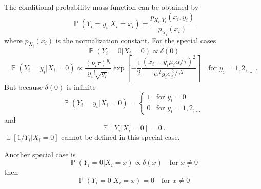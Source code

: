 \documentclass[12pt]{report}
\DeclareMathOperator{\expectation}{\mathbb{E}}
\DeclareMathOperator{\prob}{\mathbb{P}}
\newcommand{\dotdotdot}{_{\phantom{.}\cdots}}
\begin{document}
The conditional probability mass function can be obtained by
\begin{equation*}
\prob\left(Y_i=y_i|X_i=x_i\right)=\frac{p_{X_i,Y_i}\left(x_i,y_i\right)}{p_{X_i}(x_i)}
\end{equation*}
where $p_{X_i}(x_i)$ is the normalization constant.
For the special cases
\begin{equation*}
\prob\left(Y_i=0|X_i=0\right) \propto \delta(0)
\end{equation*}
\begin{equation*}
\prob\left(Y_i=y_i|X_i=0\right) \propto
\dfrac{(\nu_i\tau)^{y_i}}{y_i!\sqrt{y_i}}
\exp\left[-\dfrac{1}{2}\dfrac{\left(x_i-y_i\mu_i\alpha/\tau\right)^2}{\alpha^2y_i\sigma_i^2/\tau^2}\right]
\quad \text{for }y_i=1,2,\dotdotdot \ .
\end{equation*}
But because $\delta(0)$ is infinite
\begin{equation}
\prob\left(Y_i=y_i|X_i=0\right) =
\begin{cases}
1 & \text{for }y_i=0
\\
0 & \text{for }y_i=1,2,\dotdotdot
\end{cases}
\end{equation}
and
\begin{equation}
\expectation[Y_i|X_i=0] = 0 \ .
\end{equation}
$\expectation[1/Y_i|X_i=0]$ cannot be defined in this special case.

Another special case is
\begin{equation*}
\prob\left(Y_i=0|X_i=x\right) \propto \delta(x) \quad \text{for }x\neq0
\end{equation*}
then
\begin{equation}
\prob\left(Y_i=0|X_i=x\right) = 0 \quad \text{for }x\neq0
\end{equation}
\end{document}
